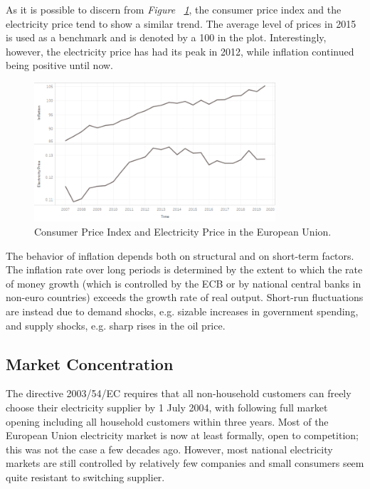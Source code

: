 \documentclass[a4paper,12pt]{book}
\begin{document}
As it is possible to discern from \textit{Figure ~\ref{fig:infl}}, the consumer price index and the electricity price tend to show a similar trend. The average level of prices in 2015 is used as a benchmark and is denoted by a 100 in the plot. Interestingly, however, the electricity price has had its peak in 2012, while inflation continued being positive until now.

\begin{figure}[tb]
\begin{center}
\captionsetup{justification=centering}
\includegraphics[width=0.8\textwidth]{Images/inf.png}
\caption{Consumer Price Index and Electricity Price in the European Union.}
\label{fig:infl}
\end{center}
\end{figure}

The behavior of inflation depends both on structural and on short-term factors. The inflation rate over long periods is determined by the extent to which the rate of money growth (which is controlled by the ECB or by national central banks in non-euro countries) exceeds the growth rate of real output. Short-run fluctuations are instead due to demand shocks, e.g. sizable increases in government spending, and supply shocks, e.g. sharp rises in the oil price.~\cite{ball1993causes}

\subsection{Market Concentration}

The directive 2003/54/EC requires that all non-household customers can freely choose their electricity supplier by 1 July 2004, with following full market opening including all household customers within three years. Most of the European Union electricity market is now at least formally, open to competition; this was not the case a few decades ago. However, most national electricity markets are still controlled by relatively few companies and small consumers seem quite resistant to switching supplier.~\cite{jamasb2005electricity}
\end{document}
